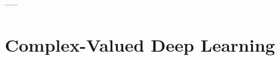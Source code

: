 \documentclass[a4paper,11pt]{book}
\begin{document}


\tableofcontents




-----

\part{Complex-Valued Deep Learning}




%
%
%
%

\newpage
\nocite{*}



\newpage
\appendix

\end{document}
